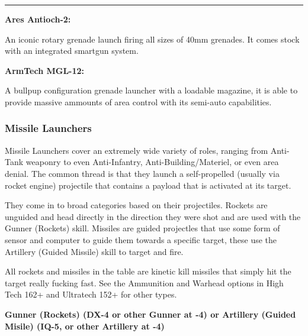 \par\rule{\textwidth}{0.5pt} 

\begin{mdframed}[linewidth=0pt]
\begin{multicols}{2}
		
	\textbf{Ares Antioch-2:}
	
	An iconic rotary grenade launch firing all sizes of 40mm grenades. It comes stock with an integrated smartgun system.
	
	\textbf{ArmTech MGL-12:}
	
	A bullpup configuration grenade launcher with a loadable magazine, it is able to provide massive ammounts of area control with its semi-auto capabilities.

\end{multicols}
\end{mdframed}

\subsubsection{Missile Launchers}

Missile Launchers cover an extremely wide variety of roles, ranging from Anti-Tank weaponry to even Anti-Infantry, Anti-Building/Materiel, or even area denial. The common thread is that they launch a self-propelled (usually via rocket engine) projectile that contains a payload that is activated at its target.

They come in to broad categories based on their projectiles. Rockets are unguided and head directly in the direction they were shot and are used with the Gunner (Rockets) skill. Missiles are guided projectles that use some form of sensor and computer to guide them towards a specific target, these use the Artillery (Guided Missile) skill to target and fire.

All rockets and missiles in the table are kinetic kill missiles that simply hit the target really fucking fast. See the Ammunition and Warhead options in High Tech 162+ and Ultratech 152+ for other types.

\noindent
\textbf{Gunner (Rockets) (DX-4 or other Gunner at -4) or Artillery (Guided Misile) (IQ-5, or other Artillery at -4)}
\begin{center} 
	\begin{adjustwidth}{-8mm}{}
	\end{adjustwidth}
\end{center}

